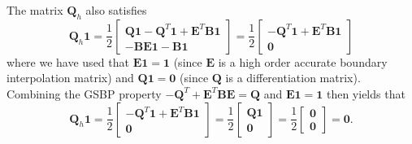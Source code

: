 \documentclass{svjour3}                     %
\begin{document}
The matrix $\bm{Q}_h$ also satisfies
\[
\bm{Q}_h\bm{1} = 
\frac{1}{2}\begin{bmatrix}
\bm{Q}\bm{1}-\bm{Q}^T\bm{1} + \bm{E}^T\bm{B}\bm{1}\\
-\bm{B}\bm{E}\bm{1} - \bm{B}\bm{1}
\end{bmatrix}= 
\frac{1}{2}\begin{bmatrix}
-\bm{Q}^T\bm{1} + \bm{E}^T\bm{B}\bm{1}\\
\bm{0}
\end{bmatrix}
\]
where we have used that $\bm{E}\bm{1} = \bm{1}$ (since $\bm{E}$ is a high order accurate boundary interpolation matrix) and $\bm{Q}\bm{1} = \bm{0}$ (since $\bm{Q}$ is a differentiation matrix).  Combining the GSBP property $-\bm{Q}^T + \bm{E}^T\bm{B}\bm{E} = \bm{Q}$ and $\bm{E}\bm{1} = \bm{1}$ then yields that 
\begin{equation}
\bm{Q}_h\bm{1} = 
\frac{1}{2}\begin{bmatrix}
-\bm{Q}^T\bm{1} + \bm{E}^T\bm{B}\bm{1}\\
\bm{0}
\end{bmatrix} = 
\frac{1}{2}\begin{bmatrix}
\bm{Q}\bm{1}\\
\bm{0}
\end{bmatrix} 
= \frac{1}{2}\begin{bmatrix}
\bm{0}\\
\bm{0}
\end{bmatrix} = \bm{0}.
\label{eq:Qh1}
\end{equation}
\end{document}
